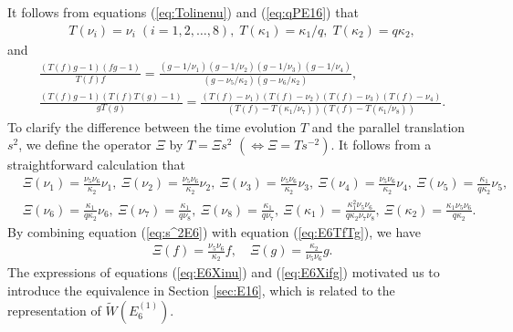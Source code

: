 \documentclass[12pt]{amsart}
\numberwithin{equation}{section}
\theoremstyle{definition}
\begin{document}
It follows from equations (\ref{eq:Tolinenu}) and (\ref{eq:qPE16}) that
\begin{align}
& \displaystyle T(\nu _i)= \nu _i \; (i=1,2,\dots ,8) , \;  T(\kappa _1 ) =  \kappa _1  / q , \; T(\kappa _2 ) = q \kappa _2 , \label{eq:E6T}
\end{align}
and
\begin{align}
& \frac{(T(f) g-1)(fg-1)}{T(f) f} = \frac{(g -1/\nu_1)(g -1/\nu_2)(g -1/\nu_3)(g -1/\nu_4)}{(g-\nu_5/\kappa_2)(g-\nu_6/\kappa_2)}, \label{eq:E6TfTg} \\
& \frac{(T(f) g- 1 )(T(f) T(g) - 1 )}{g T (g)} = \frac{(T(f) - \nu _1 ) (T(f) - \nu _2 ) (T(f) - \nu _3 ) (T(f) - \nu _4 )}{(T(f)-T(\kappa_1 / \nu_7 ))(T(f)-T(\kappa_1 / \nu_8 ))} . \nonumber
\end{align}
To clarify the difference between the time evolution $T$ and the parallel translation $s^2$, we define the operator $\Xi $ by $T= \Xi s^2$ $(\Leftrightarrow \Xi= T s^{-2})$.
It follows from a straightforward calculation that
\begin{align}
& \Xi (\nu _1) = \frac{ \nu_ 5 \nu_ 6 }{\kappa_2 } \nu _1 , \: \Xi (\nu _2) = \frac{ \nu_ 5 \nu_ 6 }{\kappa_2 }  \nu _2 , \: \Xi (\nu _3) = \frac{ \nu_ 5 \nu_ 6 }{\kappa_2 }  \nu _3 , \: \Xi (\nu _4) = \frac{ \nu_ 5 \nu_ 6 }{\kappa_2 }  \nu _4 , \: \Xi (\nu _5) = \frac{\kappa_1 }{q \kappa_2 } \nu _5, \label{eq:E6Xinu} \\
& \Xi (\nu _6) = \frac{\kappa_1 }{q \kappa_2 } \nu _6 , \: \Xi (\nu _7) = \frac{\kappa_1 }{q \nu_8 } , \: \Xi (\nu _8) = \frac{\kappa_1 }{q \nu_7 } , \: \Xi (\kappa _1) =  \frac{\kappa ^2 _1 \nu_5 \nu_6 }{q \kappa_2 \nu_7 \nu_8 } , \: \Xi (\kappa _2) = \frac{\kappa_1 \nu_5 \nu_6 }{q \kappa_2} .\nonumber
\end{align}
By combining equation (\ref{eq:s^2E6}) with equation (\ref{eq:E6TfTg}), we have
\begin{align}
& \Xi (f) = \frac{ \nu_ 5 \nu_ 6 }{\kappa_2 } f, \quad \Xi (g) = \frac{\kappa_2 }{ \nu_ 5 \nu_ 6 } g . \label{eq:E6Xifg} 
\end{align}
The expressions of equations (\ref{eq:E6Xinu}) and (\ref{eq:E6Xifg}) motivated us to introduce the equivalence in Section \ref{sec:E16}, which is related to the representation of $\widetilde{W}(E^{(1)}_{6})$.
\end{document}
